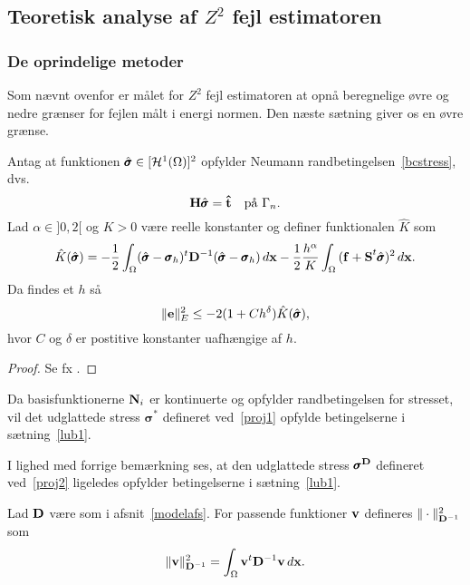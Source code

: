 \subsection{Teoretisk analyse af $Z^2$ fejl estimatoren}
\subsubsection{De oprindelige metoder}
Som nævnt ovenfor er målet for $Z^2$ fejl estimatoren at opnå
beregnelige øvre og nedre grænser for fejlen målt i energi normen. Den
næste sætning giver os en øvre grænse.
\begin{theorem} \label{lub1}
Antag at funktionen $\hat{{\pmb\sigma}} \in [\mathcal H^1(\Omega)]^2$ opfylder Neumann
rand\-be\-tin\-gel\-sen~\eqref{bcstress}, dvs.
\begin{equation}
  {\bf H}\hat{\pmb{\sigma}} = {\bf \hat{t}} \quad \text{på $\Gamma_n$}.
\end{equation}
Lad $\alpha\in ]0,2[$ og $K>0$ være reelle konstanter og definer
funktionalen $\hat{K}$ som
\begin{equation}
  \hat{K}(\hat{\pmb{\sigma}}) = -\frac{1}{2} \int_{\Omega}
  (\hat{\pmb{\sigma}} -\pmb{\sigma}_h)^t {\bf D}^{-1}
  (\hat{\pmb{\sigma}} -\pmb{\sigma}_h) \, d{\bf x} -
  \frac{1}{2} \frac{h^\alpha}{K} \int_{\Omega} {\bf (f+S}^t
  \hat{\pmb{\sigma}})^2\, d{\bf x}.
\end{equation}
Da findes et $h$ så
\begin{equation}
  \| {\bf e} \|_E^2 \leq -2(1+Ch^\delta ) \hat{K}(\hat{\pmb{\sigma}}),
\end{equation}
hvor $C$ og $\delta$ er postitive konstanter uafhængige af $h$.
\end{theorem}
\begin{proof}
Se fx \cite{zz2}.
\end{proof}
\begin{remark}
Da basisfunktionerne ${\bf N}_i$ er kontinuerte og opfylder
rand\-be\-tin\-gel\-sen for stresset, vil det udglattede stress
$\pmb{\sigma}^{\ast}$ defineret ved~\eqref{proj1} opfylde
be\-tin\-gel\-ser\-ne i sætning~\ref{lub1}.
\end{remark}
\begin{remark}
I lighed med forrige bemærkning ses, at den udglattede stress
$\pmb{\sigma}^{{\bf D}}$ defineret ved~\eqref{proj2} ligeledes
opfylder betingelserne i sætning~\ref{lub1}.
\end{remark}
\begin{definition}
Lad $\bf D$ være som i afsnit~\ref{modelafs}. For passende funktioner
${\bf v}$ defineres $\|\cdot\|_{{\bf D}^{-1}}^2$ som
\begin{equation}
  \|{\bf v}\|_{{\bf D}^{-1}}^2 = \int_{\Omega} {\bf v}^t{\bf D}^{-1}{\bf v}\, d{\bf x}.
\end{equation}
\end{definition}
